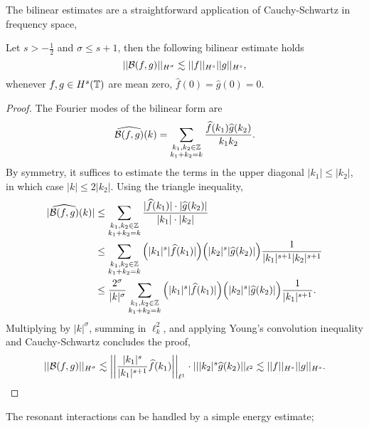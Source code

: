 The bilinear estimates are a straightforward application of Cauchy-Schwartz in frequency space, 

\begin{proposition}
    Let $s > -\tfrac12$ and $\sigma \leq s + 1$, then the following bilinear estimate holds
        \begin{equation}\label{eq:bilinear}
            ||\mathcal B(f, g)||_{H^\sigma} 
                \lesssim ||f||_{H^s} ||g||_{H^s},
        \end{equation}
    whenever $f, g \in H^s (\mathbb T)$ are mean zero, $\widehat f(0) = \widehat g(0) = 0$. 
\end{proposition}

\begin{proof}
    The Fourier modes of the bilinear form are 
        \[
            \widehat{\mathcal B(f, g)} (k)
                = \sum_{\substack{k_1, k_2 \in \mathbb Z \\ k_1 + k_2 = k}} \frac{\widehat f(k_1) \widehat g(k_2)}{k_1 k_2}.
        \]
    By symmetry, it suffices to estimate the terms in the upper diagonal $|k_1| \leq |k_2|$, in which case $|k| \leq 2 |k_2|$. Using the triangle inequality, 
        \begin{align*}
            |\widehat{\mathcal B(f, g)} (k)|
                &\leq \sum_{\substack{k_1, k_2 \in \mathbb Z \\ k_1 + k_2 = k}} \frac{|\widehat f(k_1)| \cdot |\widehat g(k_2)|}{|k_1| \cdot |k_2|}\\
                &\leq \sum_{\substack{k_1, k_2 \in \mathbb Z \\ k_1 + k_2 = k}} \Big( |k_1|^s |\widehat f(k_1)| \Big) \Big(  |k_2|^s |\widehat g(k_2)| \Big) \frac{1}{|k_1|^{s + 1} |k_2|^{s + 1}} \\
                &\leq \frac{2^\sigma}{|k|^{\sigma}} \sum_{\substack{k_1, k_2 \in \mathbb Z \\ k_1 + k_2 = k}} \Big( |k_1|^s |\widehat f(k_1)| \Big) \Big(  |k_2|^s |\widehat g(k_2)| \Big) \frac{1}{|k_1|^{s + 1}} .
        \end{align*}
    Multiplying by $|k|^\sigma$, summing in $\ell^2_k$, and applying Young's convolution inequality and Cauchy-Schwartz concludes the proof, 
        \[
            ||\mathcal B(f, g)||_{H^\sigma}
                \lesssim \left|\left| \frac{|k_1|^s}{|k_1|^{s + 1}} \widehat f(k_1) \right|\right|_{\ell^1} \cdot || |k_2|^s \widehat g(k_2)||_{\ell^2} \lesssim ||f||_{H^s} ||g||_{H^s}.
        \]
\end{proof}

The resonant interactions can be handled by a simple energy estimate; 

